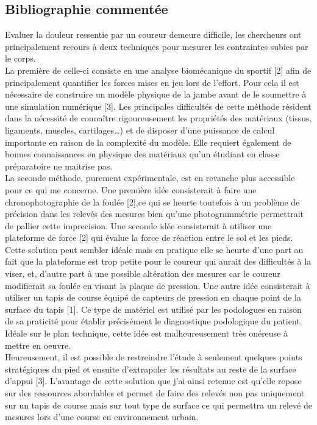 \documentclass[11pt]{article}
\begin{document}
\subsection{Bibliographie commentée}
\label{sec:org75ab1ea}
Evaluer la douleur ressentie par un coureur demeure difficile, les chercheurs ont principalement recours à deux techniques pour mesurer les contraintes subies par le corps.\\\empty
La première de celle-ci consiste en une analyse biomécanique du sportif [2] afin de principalement quantifier les forces mises en jeu lors de l'effort. Pour cela il est nécessaire de construire un modèle physique de la jambe avant de le soumettre à une simulation numérique [3]. Les principales difficultés de cette méthode résident dans la nécessité de connaître rigoureusement les propriétés des matériaux (tissus, ligaments, muscles, cartilages\ldots{}) et de disposer d'une puissance de calcul importante en raison de la complexité du modèle. Elle requiert également de bonnes connaissances en physique des matériaux qu'un étudiant en classe préparatoire ne maitrise pas.\\\empty
La seconde méthode, purement expérimentale, est en revanche plus accessible pour ce qui me concerne. Une première idée consisterait à faire une chronophotographie de la foulée [2],ce qui se heurte toutefois à un problème de précision dans les relevés des mesures bien qu'une photogrammétrie permettrait de pallier cette imprecision. Une seconde idée consisterait à utiliser une plateforme de force [2] qui évalue la force de réaction entre le sol et les pieds. Cette solution peut sembler idéale mais en pratique elle se heurte d'une part au fait que la plateforme est trop petite pour le coureur qui aurait des difficultés à la viser, et, d'autre part à une possible altération des mesures car le coureur modifierait sa foulée en visant la plaque de pression. Une autre idée consisterait à utiliser un tapis de course équipé de capteurs de pression en chaque point de la surface du tapis [1]. Ce type de matériel est utilisé par les podologues en raison de sa praticité pour établir précisément le diagnostique podologique du patient. Idéale sur le plan technique, cette idée est malheureusement très onéreuse à mettre en oeuvre.\\\empty
Heureusement, il est possible de restreindre l'étude à seulement quelques points stratégiques du pied et ensuite d'extrapoler les résultats au reste de la surface d'appui [3]. L'avantage de cette solution que j'ai ainsi retenue est qu'elle repose sur des ressources abordables et permet de faire des relevés non pas uniquement sur un tapis de course mais sur tout type de surface ce qui permettra un relevé de mesures lors d'une course en environnement urbain.\\\empty
\end{document}
